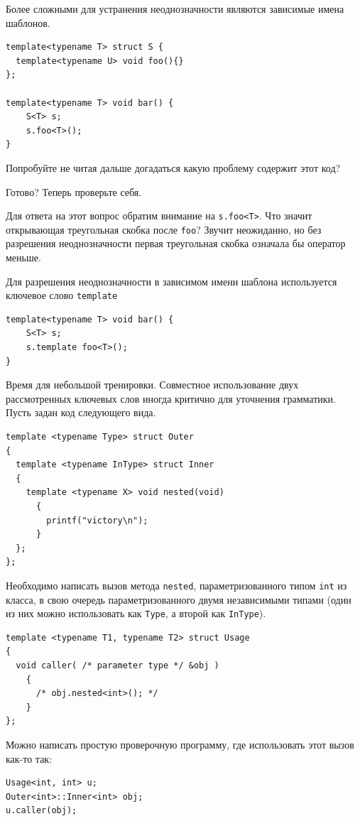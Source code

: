 \documentclass[a4paper,12pt,oneside]{article}
\begin{document}
Более сложными для устранения неоднозначности являются зависимые имена шаблонов.

\begin{lstlisting}
template<typename T> struct S {
  template<typename U> void foo(){}
};

template<typename T> void bar() {
    S<T> s;
    s.foo<T>();
}
\end{lstlisting}

Попробуйте не читая дальше догадаться какую проблему содержит этот код?

Готово? Теперь проверьте себя.

Для ответа на этот вопрос обратим внимание на \lstinline!s.foo<T>!. Что значит открывающая треугольная скобка после \lstinline!foo!? Звучит неожиданно, но без разрешения неоднозначности первая треугольная скобка означала бы оператор меньше.

Для разрешения неоднозначности в зависимом имени шаблона используется ключевое слово \lstinline!template!

\begin{lstlisting}
template<typename T> void bar() {
    S<T> s;
    s.template foo<T>();
}
\end{lstlisting}

Время для небольшой тренировки. Совместное использование двух рассмотренных ключевых слов иногда критично для уточнения грамматики. Пусть задан код следующего вида.

\begin{lstlisting}
template <typename Type> struct Outer
{
  template <typename InType> struct Inner
  {
    template <typename X> void nested(void)
      {
        printf("victory\n");
      }
  };
}; 
\end{lstlisting}

Необходимо написать вызов метода \lstinline!nested!, параметризованного типом \lstinline!int! из класса, в свою очередь параметризованного двумя независимыми типами (один из них можно использовать как \lstinline!Type!, а второй как \lstinline!InType!).

\begin{lstlisting}
template <typename T1, typename T2> struct Usage
{
  void caller( /* parameter type */ &obj )
    {
      /* obj.nested<int>(); */
    }
};
\end{lstlisting}

Можно написать простую проверочную программу, где использовать этот вызов как-то так:

\begin{lstlisting}
Usage<int, int> u;
Outer<int>::Inner<int> obj;
u.caller(obj);
\end{lstlisting}
\end{document}
